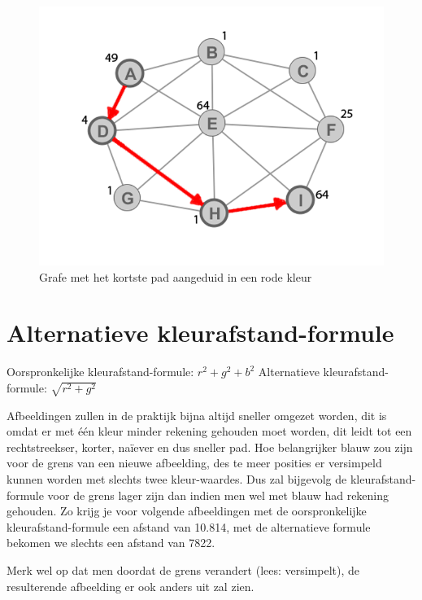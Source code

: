 \documentclass{article}
\begin{document}
\begin{figure}[h!]
\centering
\includegraphics[scale=0.4]{graph.png}
\caption{Grafe met het kortste pad aangeduid in een rode kleur}
\label{fig:Graph}
\end{figure}


\newpage
\section{Alternatieve kleurafstand-formule}

Oorspronkelijke kleurafstand-formule: $ r^2 + g^2 + b^2 $ \newline
Alternatieve kleurafstand-formule: $ \sqrt{r^2 + g^2} $

Afbeeldingen zullen in de praktijk bijna altijd sneller omgezet worden, dit is omdat er met één kleur minder rekening gehouden moet worden, dit leidt tot een rechtstreekser, korter, naïever en dus sneller pad.
Hoe belangrijker blauw zou zijn voor de grens van een nieuwe afbeelding, des te meer posities er versimpeld kunnen worden met slechts twee kleur-waardes. Dus zal bijgevolg de kleurafstand-formule voor de grens lager zijn dan indien men wel met blauw had rekening gehouden. Zo krijg je voor volgende afbeeldingen met de oorspronkelijke kleurafstand-formule een afstand van 10.814, met de alternatieve formule bekomen we slechts een afstand van 7822.

Merk wel op dat men doordat de grens verandert (lees: versimpelt), de resulterende afbeelding er ook anders uit zal zien.
\end{document}
